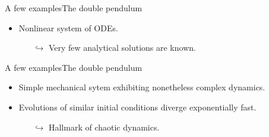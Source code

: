 \documentclass[usenames,dvipsnames,svgnames,10pt,aspectratio=169]{beamer}
\begin{document}
\begin{frame}[t, c]{A few examples}{The double pendulum}
\begin{minipage}{.68\textwidth}
\begin{itemize}
			\item Nonlinear system of ODEs.
			\begin{itemize}
				\item[\( \hookrightarrow \)] Very few analytical solutions are known.
			\end{itemize}
		\end{itemize}
	\end{minipage}

	\vspace{1cm}
\end{frame}

\begin{frame}[t, c]{A few examples}{The double pendulum}
	\begin{minipage}{.48\textwidth}
		\begin{itemize}
			\item Simple mechanical sytem exhibiting nonetheless complex dynamics.

			\bigskip

			\item Evolutions of similar initial conditions diverge exponentially fast.
			\begin{itemize}
				\item[\( \hookrightarrow	\)] Hallmark of chaotic dynamics.
			\end{itemize}

			\medskip


\end{itemize}
\end{minipage}
\end{frame}
\end{document}
